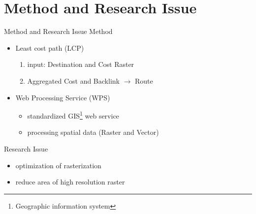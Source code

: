 \documentclass[usenames,dvipsnames,aspectratio=169]{beamer}
\begin{document}
\section{Method and Research Issue}
\begin{frame}{Method and Research Issue}
	Method
	\begin{itemize}
		\item Least cost path (LCP)
		\begin{enumerate}
			\item input: Destination and Cost Raster
			\item Aggregated Cost and Backlink $\rightarrow$ Route
		\end{enumerate}
		\item Web Processing Service (WPS)
		\begin{itemize}
			\item standardized GIS\footnote{Geographic information system} web service
			\item processing spatial data (Raster and Vector)
		\end{itemize}
	\end{itemize}
Research Issue
\begin{itemize}
\item optimization of rasterization
\item reduce area of high resolution raster
\end{itemize}
\end{frame}
\end{document}
